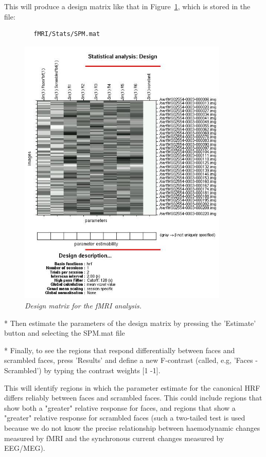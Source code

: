 This will produce a design matrix like that in Figure~\ref{fig_32_21}, which is stored in the file:
\begin{verbatim}
		fMRI/Stats/SPM.mat
\end{verbatim}

\begin{figure}
\begin{center}
\includegraphics[width=100mm]{multimodal/figures/figure_32_21}
\caption{\em Design matrix for the fMRI analysis. \label{fig_32_21}}
\end{center}
\end{figure}

* Then estimate the parameters of the design matrix by pressing the 'Estimate' button and selecting the SPM.mat file

* Finally, to see the regions that respond differentially between faces and scrambled faces, press 'Results' and define a new F-contrast (called, e.g, 'Faces - Scrambled') by typing the contrast weights [1 -1].

This will identify regions in which the parameter estimate for the canonical HRF differs reliably between faces and scrambled faces. This could include regions that show both a "greater" relative response for faces, and regions that show a "greater" relative response for scrambled faces (such a two-tailed test is used because we do not know the precise relationship between haemodynamic changes measured by fMRI and the synchronous current changes measured by EEG/MEG).

